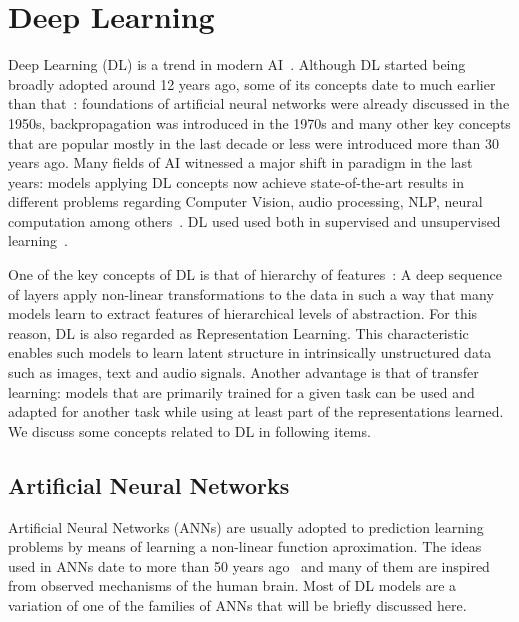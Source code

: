 \documentclass[English]{style/ic-tese-v3}
\begin{document}
\section{Deep Learning}
Deep Learning (DL) is a trend in modern AI~\cite{ref:dl}.
Although DL started being broadly adopted around 12 years ago,
some of its concepts date to much earlier than that~\cite{ref:dl}:
foundations of artificial neural networks were already discussed
in the 1950s, backpropagation was introduced in the 1970s
and many other key concepts that are popular mostly in the last decade or less
were introduced more than 30 years ago.
Many fields of AI witnessed a major shift in paradigm
in the last years: models applying DL concepts now achieve state-of-the-art
results in different problems regarding Computer Vision,
audio processing, NLP, neural computation among others~\cite{ref:dl-book}.
DL used used both in supervised and unsupervised learning~\cite{ref:dl}.

One of the key concepts of DL is that of hierarchy of features~\cite{ref:dl}:
A deep sequence of layers apply non-linear transformations to the data
in such a way that many models learn to extract features of hierarchical
levels of abstraction.
For this reason, DL is also regarded as Representation Learning.
This characteristic enables such models to learn latent structure
in intrinsically unstructured data such as images, text and audio signals.
Another advantage is that of transfer learning: models that are
primarily trained for a given task can be used and adapted for another
task while using at least part of the representations learned.
We discuss some concepts related to DL in following items.

\subsection{Artificial Neural Networks}
Artificial Neural Networks (ANNs) are usually adopted to prediction
learning problems by means of learning a non-linear function aproximation.
The ideas used in ANNs date to more than 50 years ago~\cite{ref:perceptron} and many of them
are inspired from observed mechanisms of the human brain.
Most of DL models are a variation of one of the families of ANNs
that will be briefly discussed here.
\end{document}
